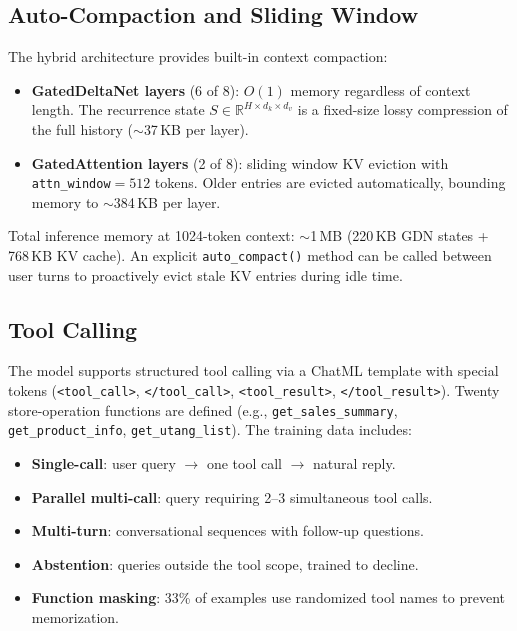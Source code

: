 \documentclass[11pt,a4paper]{article}
\begin{document}
\subsection{Auto-Compaction and Sliding Window}
\label{sec:compact}

The hybrid architecture provides built-in context compaction:

\begin{itemize}[leftmargin=*]
  \item \textbf{GatedDeltaNet layers} (6 of 8): $O(1)$ memory regardless of
    context length. The recurrence state $S \in \mathbb{R}^{H \times d_k \times d_v}$
    is a fixed-size lossy compression of the full history ($\sim$37\,KB per layer).
  \item \textbf{GatedAttention layers} (2 of 8): sliding window KV eviction with
    \texttt{attn\_window}$=512$ tokens. Older entries are evicted automatically,
    bounding memory to $\sim$384\,KB per layer.
\end{itemize}

Total inference memory at 1024-token context: $\sim$1\,MB (220\,KB GDN states +
768\,KB KV cache). An explicit \texttt{auto\_compact()} method can be called
between user turns to proactively evict stale KV entries during idle time.

\subsection{Tool Calling}
\label{sec:tools}

The model supports structured tool calling via a ChatML template with special
tokens (\texttt{<tool\_call>}, \texttt{</tool\_call>}, \texttt{<tool\_result>},
\texttt{</tool\_result>}). Twenty store-operation functions are defined
(e.g., \texttt{get\_sales\_summary}, \texttt{get\_product\_info},
\texttt{get\_utang\_list}). The training data includes:

\begin{itemize}[leftmargin=*]
  \item \textbf{Single-call}: user query $\to$ one tool call $\to$ natural reply.
  \item \textbf{Parallel multi-call}: query requiring 2--3 simultaneous tool calls.
  \item \textbf{Multi-turn}: conversational sequences with follow-up questions.
  \item \textbf{Abstention}: queries outside the tool scope, trained to decline.
  \item \textbf{Function masking}: 33\% of examples use randomized tool names
    to prevent memorization.
\end{itemize}
\end{document}
